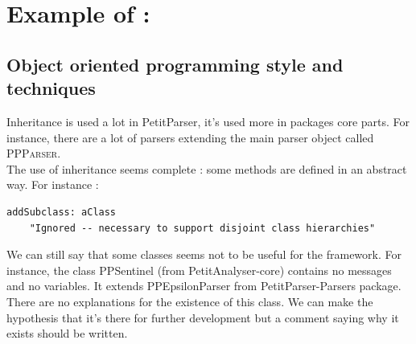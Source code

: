 \section{Example of :}
\subsection{Object oriented programming style and techniques}
Inheritance is used a lot in PetitParser, it's used more in packages core parts. For instance, there are a lot of parsers extending the main parser object called \textsc{PPParser}. \\
The use of inheritance seems complete : some methods are defined in an abstract way. For instance : 
\begin{lstlisting}
addSubclass: aClass
	"Ignored -- necessary to support disjoint class hierarchies"
\end{lstlisting}
We can still say that some classes seems not to be useful for the framework. For instance, the class PPSentinel (from PetitAnalyser-core) contains no messages and no variables. It extends PPEpsilonParser from PetitParser-Parsers package. There are no explanations for the existence of this class. We can make the hypothesis that it's there for further development but a comment saying why it exists should be written.


